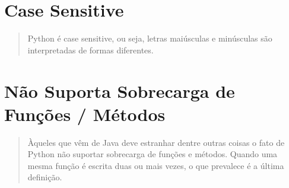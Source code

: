 \documentclass[letterpaper,10pt,brazil]{sphinxmanual}
\begin{document}
\begin{sphinxVerbatim}[commandchars=\\\{\}]
\end{sphinxVerbatim}


\section{Case Sensitive}
\label{\detokenize{content/language_particularities:case-sensitive}}\begin{quote}

Python é case sensitive, ou seja, letras maiúsculas e minúsculas são interpretadas de formas diferentes.
\end{quote}

\begin{sphinxVerbatim}[commandchars=\\\{\}]
  
  
\end{sphinxVerbatim}

\begin{sphinxVerbatim}[commandchars=\\\{\}]
\end{sphinxVerbatim}

\begin{sphinxVerbatim}[commandchars=\\\{\}]
\end{sphinxVerbatim}

\begin{sphinxVerbatim}[commandchars=\\\{\}]
\end{sphinxVerbatim}


\section{Não Suporta Sobrecarga de Funções / Métodos}
\label{\detokenize{content/language_particularities:nao-suporta-sobrecarga-de-funcoes-metodos}}\begin{quote}

Àqueles que vêm de Java deve estranhar dentre outras coisas o fato de Python não suportar sobrecarga de funções e métodos.
Quando uma mesma função é escrita duas ou mais vezes, o que prevalece é a última definição.
\end{quote}
\end{document}
